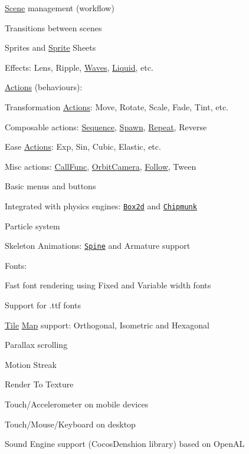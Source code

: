 \begin{DoxyItemize}
\item \hyperlink{classScene}{Scene} management (workflow)
\item Transitions between scenes
\item Sprites and \hyperlink{classSprite}{Sprite} Sheets
\item Effects\+: Lens, Ripple, \hyperlink{classWaves}{Waves}, \hyperlink{classLiquid}{Liquid}, etc.
\item \hyperlink{classActions}{Actions} (behaviours)\+:
\begin{DoxyItemize}
\item Transformation \hyperlink{classActions}{Actions}\+: Move, Rotate, Scale, Fade, Tint, etc.
\item Composable actions\+: \hyperlink{classSequence}{Sequence}, \hyperlink{classSpawn}{Spawn}, \hyperlink{classRepeat}{Repeat}, Reverse
\item Ease \hyperlink{classActions}{Actions}\+: Exp, Sin, Cubic, Elastic, etc.
\item Misc actions\+: \hyperlink{classCallFunc}{Call\+Func}, \hyperlink{classOrbitCamera}{Orbit\+Camera}, \hyperlink{classFollow}{Follow}, Tween
\end{DoxyItemize}
\item Basic menus and buttons
\item Integrated with physics engines\+: \href{http://www.box2d.org}{\tt Box2d} and \href{http://www.chipmunk-physics.net}{\tt Chipmunk}
\item Particle system
\item Skeleton Animations\+: \href{http://esotericsoftware.com/}{\tt Spine} and Armature support
\item Fonts\+:
\begin{DoxyItemize}
\item Fast font rendering using Fixed and Variable width fonts
\item Support for .ttf fonts
\end{DoxyItemize}
\item \hyperlink{structTile}{Tile} \hyperlink{classMap}{Map} support\+: Orthogonal, Isometric and Hexagonal
\item Parallax scrolling
\item Motion Streak
\item Render To Texture
\item Touch/\+Accelerometer on mobile devices
\item Touch/\+Mouse/\+Keyboard on desktop
\item Sound Engine support (Cocos\+Denshion library) based on Open\+AL

\end{DoxyItemize}
